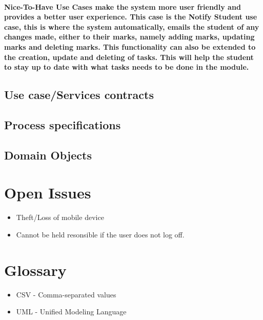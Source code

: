 \documentclass[12pt]{article}
\begin{document}
 \paragraph*{Nice-To-Have Use Cases make the system more user friendly and provides a better user experience. This case is the Notify Student use case, this is where the system automatically, emails the student of any changes made, either to their marks, namely adding marks, updating marks and deleting marks. This functionality can also be extended to the creation, update and deleting of tasks. This will help the student to stay up to date with what tasks needs to be done in the module.}
 \subsection{Use case/Services contracts}
 \subsection{Process specifications}
 \subsection{Domain Objects}
 \section{Open Issues}
\begin{itemize}
  \item Theft/Loss of mobile device
  \item Cannot be held resonsible if the user does not log off.
\end{itemize}
 \section{Glossary} 
 \begin{itemize}
  \item CSV - Comma-separated values
  \item UML - Unified Modeling Language
\end{itemize}
\end{document}
